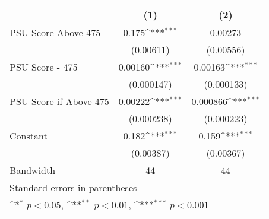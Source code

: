 {
\def\sym#1{\ifmmode^{#1}\else\(^{#1}\)\fi}
\begin{tabular}{l*{2}{c}}
\hline\hline
                    &\multicolumn{1}{c}{(1)}&\multicolumn{1}{c}{(2)}\\
\hline
PSU Score Above 475 &       0.175\sym{***}&     0.00273         \\
                    &   (0.00611)         &   (0.00556)         \\
[1em]
PSU Score - 475     &     0.00160\sym{***}&     0.00163\sym{***}\\
                    &  (0.000147)         &  (0.000133)         \\
[1em]
PSU Score if Above 475&     0.00222\sym{***}&    0.000866\sym{***}\\
                    &  (0.000238)         &  (0.000223)         \\
[1em]
Constant            &       0.182\sym{***}&       0.159\sym{***}\\
                    &   (0.00387)         &   (0.00367)         \\
\hline
Bandwidth           &          44         &          44         \\
\hline\hline
\multicolumn{3}{l}{\footnotesize Standard errors in parentheses}\\
\multicolumn{3}{l}{\footnotesize \sym{*} \(p<0.05\), \sym{**} \(p<0.01\), \sym{***} \(p<0.001\)}\\
\end{tabular}
}
